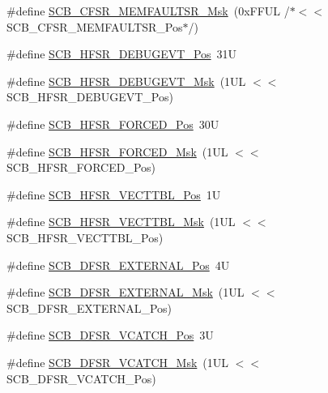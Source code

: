 \begin{DoxyCompactItemize}
\item 
\#define \hyperlink{group___c_m_s_i_s___s_c_b_gad46716159a3808c9e7da22067d6bec98}{S\+C\+B\+\_\+\+C\+F\+S\+R\+\_\+\+M\+E\+M\+F\+A\+U\+L\+T\+S\+R\+\_\+\+Msk}~(0x\+F\+F\+U\+L /$\ast$$<$$<$ S\+C\+B\+\_\+\+C\+F\+S\+R\+\_\+\+M\+E\+M\+F\+A\+U\+L\+T\+S\+R\+\_\+\+Pos$\ast$/)
\item 
\#define \hyperlink{group___c_m_s_i_s___s_c_b_ga300c90cfb7b35c82b4d44ad16c757ffb}{S\+C\+B\+\_\+\+H\+F\+S\+R\+\_\+\+D\+E\+B\+U\+G\+E\+V\+T\+\_\+\+Pos}~31U
\item 
\#define \hyperlink{group___c_m_s_i_s___s_c_b_gababd60e94756bb33929d5e6f25d8dba3}{S\+C\+B\+\_\+\+H\+F\+S\+R\+\_\+\+D\+E\+B\+U\+G\+E\+V\+T\+\_\+\+Msk}~(1\+U\+L $<$$<$ S\+C\+B\+\_\+\+H\+F\+S\+R\+\_\+\+D\+E\+B\+U\+G\+E\+V\+T\+\_\+\+Pos)
\item 
\#define \hyperlink{group___c_m_s_i_s___s_c_b_gab361e54183a378474cb419ae2a55d6f4}{S\+C\+B\+\_\+\+H\+F\+S\+R\+\_\+\+F\+O\+R\+C\+E\+D\+\_\+\+Pos}~30U
\item 
\#define \hyperlink{group___c_m_s_i_s___s_c_b_ga6560d97ed043bc01152a7247bafa3157}{S\+C\+B\+\_\+\+H\+F\+S\+R\+\_\+\+F\+O\+R\+C\+E\+D\+\_\+\+Msk}~(1\+U\+L $<$$<$ S\+C\+B\+\_\+\+H\+F\+S\+R\+\_\+\+F\+O\+R\+C\+E\+D\+\_\+\+Pos)
\item 
\#define \hyperlink{group___c_m_s_i_s___s_c_b_ga77993da8de35adea7bda6a4475f036ab}{S\+C\+B\+\_\+\+H\+F\+S\+R\+\_\+\+V\+E\+C\+T\+T\+B\+L\+\_\+\+Pos}~1U
\item 
\#define \hyperlink{group___c_m_s_i_s___s_c_b_gaac5e289211d0a63fe879a9691cb9e1a9}{S\+C\+B\+\_\+\+H\+F\+S\+R\+\_\+\+V\+E\+C\+T\+T\+B\+L\+\_\+\+Msk}~(1\+U\+L $<$$<$ S\+C\+B\+\_\+\+H\+F\+S\+R\+\_\+\+V\+E\+C\+T\+T\+B\+L\+\_\+\+Pos)
\item 
\#define \hyperlink{group___c_m_s_i_s___s_c_b_ga13f502fb5ac673df9c287488c40b0c1d}{S\+C\+B\+\_\+\+D\+F\+S\+R\+\_\+\+E\+X\+T\+E\+R\+N\+A\+L\+\_\+\+Pos}~4U
\item 
\#define \hyperlink{group___c_m_s_i_s___s_c_b_ga3cba2ec1f588ce0b10b191d6b0d23399}{S\+C\+B\+\_\+\+D\+F\+S\+R\+\_\+\+E\+X\+T\+E\+R\+N\+A\+L\+\_\+\+Msk}~(1\+U\+L $<$$<$ S\+C\+B\+\_\+\+D\+F\+S\+R\+\_\+\+E\+X\+T\+E\+R\+N\+A\+L\+\_\+\+Pos)
\item 
\#define \hyperlink{group___c_m_s_i_s___s_c_b_gad02d3eaf062ac184c18a7889c9b6de57}{S\+C\+B\+\_\+\+D\+F\+S\+R\+\_\+\+V\+C\+A\+T\+C\+H\+\_\+\+Pos}~3U
\item 
\#define \hyperlink{group___c_m_s_i_s___s_c_b_gacbb931575c07b324ec793775b7c44d05}{S\+C\+B\+\_\+\+D\+F\+S\+R\+\_\+\+V\+C\+A\+T\+C\+H\+\_\+\+Msk}~(1\+U\+L $<$$<$ S\+C\+B\+\_\+\+D\+F\+S\+R\+\_\+\+V\+C\+A\+T\+C\+H\+\_\+\+Pos)
$$
\end{DoxyCompactItemize}

